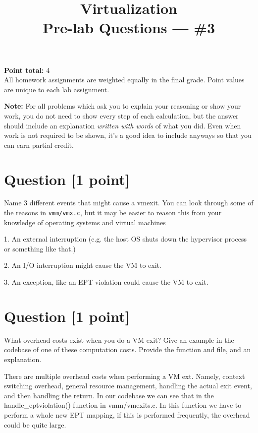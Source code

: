 \documentclass[11pt]{article}
\providecommand{\due}{}
\begin{document}
\title{Virtualization\\Pre-lab Questions --- \#3}
\date{\due}

\maketitle

\noindent \textbf{Point total:} 4
\\ All homework assignments are weighted equally in the final grade. Point values are unique to each lab assignment.

\textbf{Note:} For all problems which ask you to explain your reasoning or show your work, you do not need to show every step of each calculation, but the answer should include an explanation \emph{written with words} of what you did.  Even when work is not required to be shown, it’s a good idea to include anyways so that you can earn partial credit.

\section{Question [1 point]}

Name 3 different events that might cause a vmexit. You can look through some of the reasons in \texttt{vmm/vmx.c}, but it may be easier to reason this from your knowledge of operating systems and virtual machines

\begin{solution}
1. An external interruption (e.g. the host OS shuts down the hypervisor process or something like that.)

2. An I/O interruption might cause the VM to exit.

3. An exception, like an EPT violation could cause the VM to exit. 
\end{solution}


\section{Question [1 point]}

What overhead costs exist when you do a VM exit? Give an example in the codebase of one of these computation costs. Provide the function and file, and an explanation.

\begin{solution}
There are multiple overhead costs when performing a VM ext. Namely, context switching overhead, general resource management, handling the actual exit event, and then handling the return.
In our codebase we can see that in the handle_eptviolation() function in vmm/vmexits.c. In this function we have to perform a whole new EPT mapping, if this is performed frequently, the overhead 
could be quite large. 

\end{solution}
\end{document}
